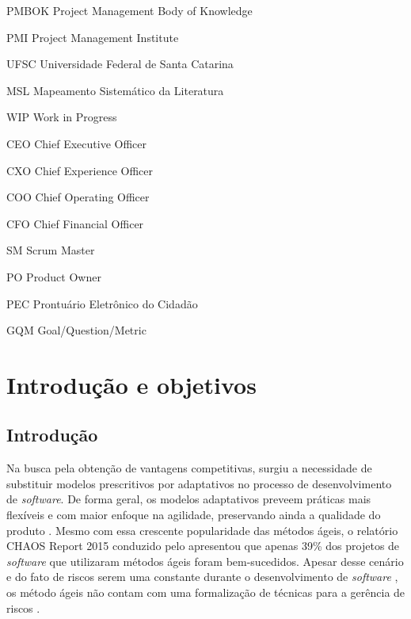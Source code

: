 \documentclass[
    12pt,       %
    openright,      %
    twoside,      %
    a4paper,      %
    english,      %
    french,       %
    spanish,      %
    brazil,       %
    ]{abntex2}
\begin{document}
  \begin{siglas}
    \item[PMBOK] Project Management Body of Knowledge
    \item[PMI]  Project Management Institute
    \item[UFSC] Universidade Federal de Santa Catarina
    \item[MSL] Mapeamento Sistemático da Literatura
    \item[WIP] Work in Progress
    \item[CEO] Chief Executive Officer
    \item[CXO] Chief Experience Officer
    \item[COO] Chief Operating Officer
    \item[CFO] Chief Financial Officer
    \item[SM] Scrum Master
    \item[PO] Product Owner
    \item[PEC] Prontuário Eletrônico do Cidadão
    \item[GQM] Goal/Question/Metric

 \end{siglas}

  \tableofcontents*
  \cleardoublepage



  \textual


\chapter{Introdução e objetivos}
\label{sec:Introducao}
\section{Introdução}

Na busca pela obtenção de vantagens competitivas, surgiu a necessidade de substituir modelos prescritivos por adaptativos no processo de desenvolvimento de \textit{software}. De forma geral, os modelos adaptativos preveem práticas mais flexíveis e com maior enfoque na agilidade, preservando ainda a qualidade do produto \cite{Rech:2013}. Mesmo com essa crescente popularidade das métodos ágeis, o relatório CHAOS Report 2015 conduzido pelo   apresentou que apenas 39\% dos projetos de \textit{software} que utilizaram métodos ágeis foram bem-sucedidos. Apesar desse cenário e do fato de riscos serem uma constante durante o desenvolvimento de \textit{software} \cite{Cunha:2013}, os método ágeis não contam com uma formalização de técnicas para a gerência de riscos \cite{Tomanek:2015}.
\end{document}
